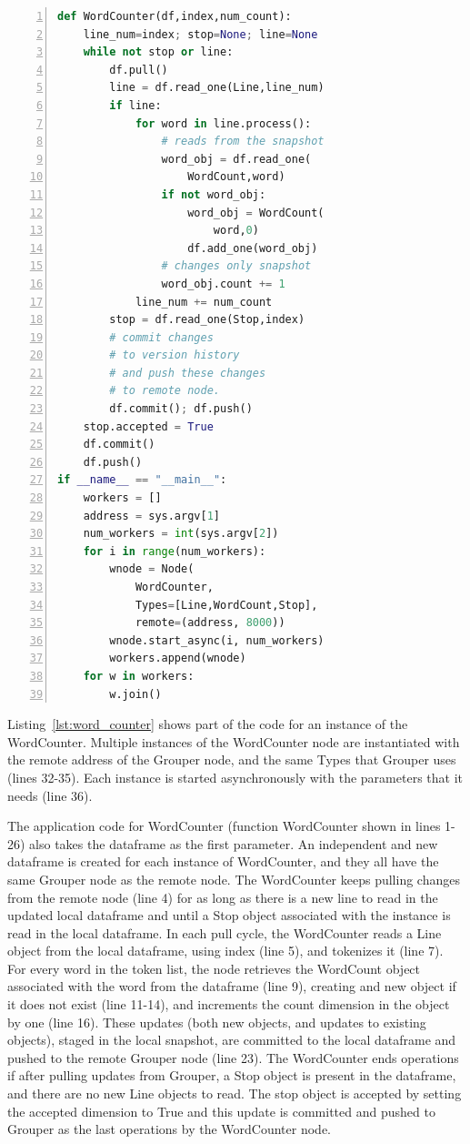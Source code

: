 \begin{lstlisting}[language=Python,basicstyle=\small, numbers=left, 
label=lst:word_counter, captionpos=b, caption=The Word Counter node.]
def WordCounter(df,index,num_count):
    line_num=index; stop=None; line=None
    while not stop or line:
        df.pull()
        line = df.read_one(Line,line_num)
        if line:
            for word in line.process():
                # reads from the snapshot
                word_obj = df.read_one(
                    WordCount,word)
                if not word_obj:
                    word_obj = WordCount(
                        word,0)
                    df.add_one(word_obj)
                # changes only snapshot
                word_obj.count += 1
            line_num += num_count
        stop = df.read_one(Stop,index)
        # commit changes 
        # to version history
        # and push these changes
        # to remote node.
        df.commit(); df.push()
    stop.accepted = True
    df.commit()
    df.push()
if __name__ == "__main__":
    workers = []
    address = sys.argv[1]
    num_workers = int(sys.argv[2])
    for i in range(num_workers):
        wnode = Node(
            WordCounter,
            Types=[Line,WordCount,Stop],
            remote=(address, 8000))
        wnode.start_async(i, num_workers)
        workers.append(wnode)
    for w in workers:
        w.join()
\end{lstlisting}

Listing~\ref{lst:word_counter} shows part of the code for an instance of the WordCounter. Multiple instances of the WordCounter node are instantiated with the remote address of the Grouper node, and the same Types that Grouper uses (lines 32-35). Each instance is started asynchronously with the parameters that it needs (line 36). 

The application code for WordCounter (function WordCounter shown in lines 1-26) also takes the dataframe as the first parameter. An independent and new dataframe is created for each instance of WordCounter, and they all have the same Grouper node as the remote node. The WordCounter keeps pulling changes from the remote node (line 4) for as long as there is a new line to read in the updated local dataframe and until a Stop object associated with the instance is read in the local dataframe. In each pull cycle, the WordCounter reads a Line object from the local dataframe, using index (line 5), and tokenizes it (line 7). For every word in the token list, the node retrieves the WordCount object associated with the word from the dataframe (line 9), creating and new object if it does not exist (line 11-14), and increments the count dimension in the object by one (line 16). These updates (both new objects, and updates to existing objects), staged in the local snapshot, are committed to the local dataframe and pushed to the remote Grouper node (line 23). The WordCounter ends operations if after pulling updates from Grouper, a Stop object is present in the dataframe, and there are no new Line objects to read. The stop object is accepted by setting the accepted dimension to True and this update is committed and pushed to Grouper as the last operations by the WordCounter node.

